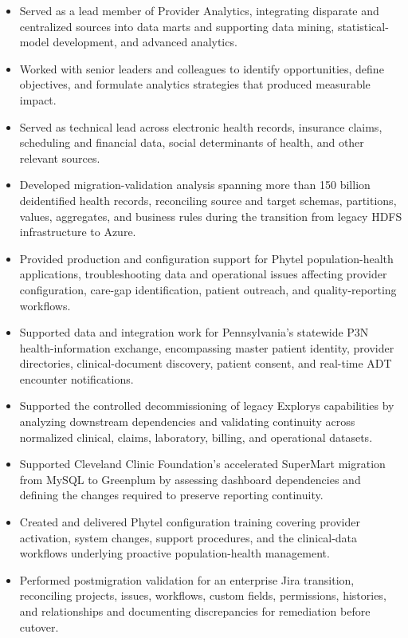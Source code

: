 \begin{itemize}
  \item Served as a lead member of Provider Analytics, integrating disparate and centralized sources into data marts and supporting data mining, statistical-model development, and advanced analytics.
  \item Worked with senior leaders and colleagues to identify opportunities, define objectives, and formulate analytics strategies that produced measurable impact.
  \item Served as technical lead across electronic health records, insurance claims, scheduling and financial data, social determinants of health, and other relevant sources.
  \item Developed migration-validation analysis spanning more than 150 billion deidentified health records, reconciling source and target schemas, partitions, values, aggregates, and business rules during the transition from legacy HDFS infrastructure to Azure.
  \item Provided production and configuration support for Phytel population-health applications, troubleshooting data and operational issues affecting provider configuration, care-gap identification, patient outreach, and quality-reporting workflows.
  \item Supported data and integration work for Pennsylvania's statewide P3N health-information exchange, encompassing master patient identity, provider directories, clinical-document discovery, patient consent, and real-time ADT encounter notifications.
  \item Supported the controlled decommissioning of legacy Explorys capabilities by analyzing downstream dependencies and validating continuity across normalized clinical, claims, laboratory, billing, and operational datasets.
  \item Supported Cleveland Clinic Foundation's accelerated SuperMart migration from MySQL to Greenplum by assessing dashboard dependencies and defining the changes required to preserve reporting continuity.
  \item Created and delivered Phytel configuration training covering provider activation, system changes, support procedures, and the clinical-data workflows underlying proactive population-health management.
  \item Performed postmigration validation for an enterprise Jira transition, reconciling projects, issues, workflows, custom fields, permissions, histories, and relationships and documenting discrepancies for remediation before cutover.

\end{itemize}
